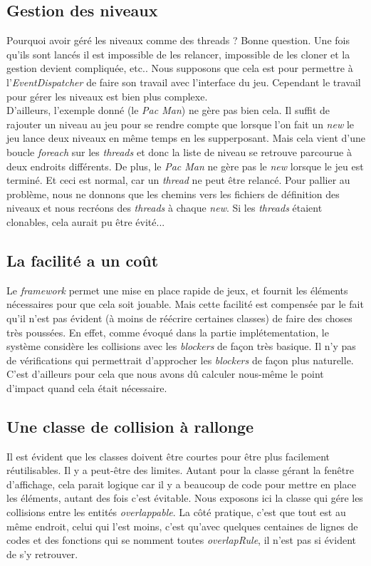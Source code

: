 \documentclass[a4paper,10pt]{article}
\begin{document}
    \subsection{Gestion des niveaux}
        Pourquoi avoir géré les niveaux comme des threads ? Bonne question. Une fois qu'ils sont lancés il est impossible de les
        relancer, impossible de les cloner et la gestion devient compliquée, etc.. Nous supposons que cela est pour permettre
        à l'\textit{EventDispatcher} de faire son travail avec l'interface du jeu. Cependant le travail pour gérer
        les niveaux est bien plus complexe. \\
        D'ailleurs, l'exemple donné (le \textit{Pac Man}) ne gère pas bien cela. Il suffit de rajouter un niveau au jeu
        pour se rendre compte que lorsque l'on fait un \textit{new} le jeu lance
        deux niveaux en même temps en les supperposant. Mais cela vient d'une boucle \textit{foreach} sur les \textit{threads} et donc
        la liste de niveau se retrouve parcourue à deux endroits différents. De plus, le \textit{Pac Man} ne gère
        pas le \textit{new} lorsque le jeu est terminé. Et ceci est normal, car un \textit{thread} ne peut être
        relancé. Pour pallier au problème, nous ne donnons que les chemins vers les fichiers de définition des
        niveaux et nous recréons des \textit{threads} à chaque \textit{new}. Si les \textit{threads} étaient
        clonables, cela aurait pu être évité...

    \subsection{La facilité a un coût}
        Le \textit{framework} permet une mise en place rapide de jeux, et fournit les éléments nécessaires pour
        que cela soit jouable. Mais cette facilité est compensée par le fait qu'il n'est pas évident (à moins
        de réécrire certaines classes) de faire des choses très poussées. En effet, comme évoqué dans la partie
        implétementation, le système considère les collisions avec les \textit{blockers} de façon très basique.
        Il n'y pas de vérifications qui permettrait d'approcher les \textit{blockers} de façon plus
        naturelle. C'est d'ailleurs pour cela que nous avons dû calculer nous-même le point d'impact quand cela
        était nécessaire.

    \subsection{Une classe de collision à rallonge}
        Il est évident que les classes doivent être courtes pour être plus facilement réutilisables. Il y a peut-être
        des limites. Autant pour la classe gérant la fenêtre d'affichage, cela parait logique car il y a beaucoup
        de code pour mettre en place les éléments, autant des fois c'est évitable. Nous exposons ici la classe
        qui gére les collisions entre les entités \textit{overlappable}. La côté pratique, c'est que tout est au
        même endroit, celui qui l'est moins, c'est qu'avec quelques centaines de lignes de codes et des fonctions
        qui se nomment toutes \textit{overlapRule}, il n'est pas si évident de s'y retrouver.
\end{document}
